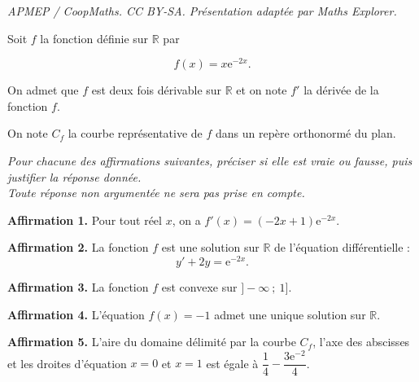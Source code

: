 \documentclass[10pt]{article}
\providecommand{\R}{\mathbb{R}}
\providecommand{\e}{{\mathrm{e}}}
\begin{document}
\noindent\textit{APMEP / CoopMaths. CC BY-SA. Présentation adaptée par Maths Explorer.}\par\medskip
Soit $f$ la fonction définie sur $\R$ par

\[f(x)=x \e^{-2 x}.\]

On admet que $f$ est deux fois dérivable sur $\R$ et on note $f'$ la dérivée de la fonction $f$.

On note $C_{f}$ la courbe représentative de $f$ dans un repère orthonormé du plan.

\medskip

\emph{Pour chacune des affirmations suivantes, préciser si elle est vraie ou fausse, puis justifier la réponse donnée.\\Toute réponse non argumentée ne sera pas prise en compte.}

\bigskip

	\textbf{Affirmation 1.} Pour tout réel $x$, on a $f'(x)=(-2 x+1) \e^{-2 x}$.

	\bigskip

	\textbf{Affirmation 2.} La fonction $f$ est une solution sur $\R$ de l'équation différentielle :
	\[y'+2 y=\e^{-2 x}.\]

	\bigskip

	\textbf{Affirmation 3.} La fonction $f$ est convexe sur $]-\infty ~;~ 1]$.

	\bigskip

	\textbf{Affirmation 4.} L'équation $f(x)=-1$ admet une unique solution sur $\R$.

	\bigskip

	\textbf{Affirmation 5.} L'aire du domaine délimité par la courbe $C_{f}$, l'axe des abscisses et les droites d'équation $x=0$ et $x=1$ est égale à $\dfrac{1}{4}-\dfrac{3 \e^{-2}}{4}$.

\bigskip
\end{document}
